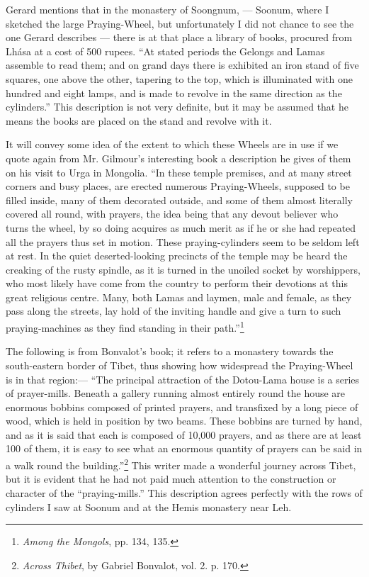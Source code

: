 \documentclass[a4paper, 11pt, oneside, polutonikogreek, english]{article}
\begin{document}
Gerard mentions that in the monastery of Soongnum, --- Soonum, where I sketched the large Praying-Wheel, but unfortunately I did not chance to see the one Gerard describes --- there is at that place a library of books, procured from Lhása at a cost of 500 rupees. ``At stated periods the Gelongs and Lamas assemble to read them; and on grand days there is exhibited an iron stand of five squares, one above the other, tapering to the top, which is illuminated with one hundred and eight lamps, and is made to revolve in the same direction as the cylinders.'' This description is not very definite, but it may be assumed that he means the books are placed on the stand and revolve with it.

It will convey some idea of the extent to which these Wheels are in use if we quote again from Mr. Gilmour's interesting book a description he gives of them on his visit to Urga in Mongolia. ``In these temple premises, and at many street corners and busy places, are erected numerous Praying-Wheels, supposed to be filled inside, many of them decorated outside, and some of them almost literally covered all round, with prayers, the idea being that any devout believer who turns the wheel, by so doing acquires as much merit as if he or she had repeated all the prayers thus set in motion. These praying-cylinders seem to be seldom left at rest. In the quiet deserted-looking precincts of the temple may be heard the creaking of the rusty spindle, as it is turned in the unoiled socket by worshippers, who most likely have come from the country to perform their devotions at this great religious centre. Many, both Lamas and laymen, male and female, as they pass along the streets, lay hold of the inviting handle and give a turn to such praying-machines as they find standing in their path.''\footnote{\emph{Among the Mongols}, pp. 134, 135.}

The following is from Bonvalot's book; it refers to a monastery towards the south-eastern border of Tibet, thus showing how widespread the Praying-Wheel is in that region:--- ``The principal attraction of the Dotou-Lama house is a series of prayer-mills. Beneath a gallery running almost entirely round the house are enormous bobbins composed of printed prayers, and transfixed by a long piece of wood, which is held in position by two beams. These bobbins are turned by hand, and as it is said that each is composed of 10,000 prayers, and as there are at least 100 of them, it is easy to see what an enormous quantity of prayers can be said in a walk round the building.''\footnote{\emph{Across Thibet}, by Gabriel Bonvalot, vol. 2. p. 170.} This writer made a wonderful journey across Tibet, but it is evident that he had not paid much attention to the construction or character of the ``praying-mills.'' This description agrees perfectly with the rows of cylinders I saw at Soonum and at the Hemis monastery near Leh.
\end{document}
